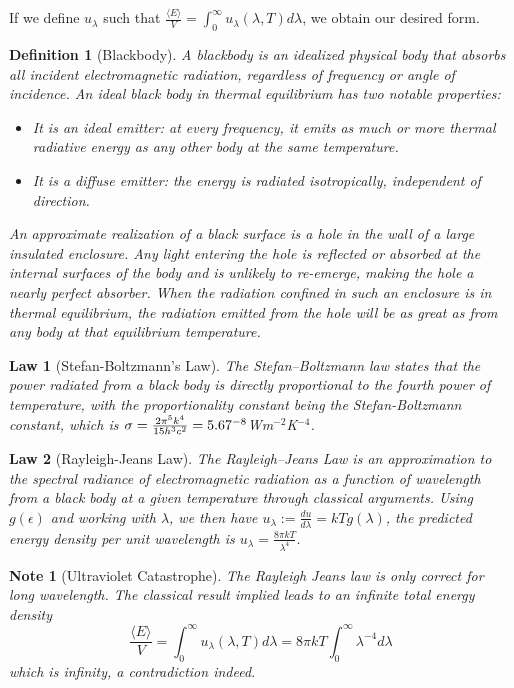 \documentclass[a4paper]{article}
\newtheorem{Note}{Note}[section]
\theoremstyle{new}
\newtheorem{law}{Law}[section]
\newtheorem{defi}{Definition}[section]
\begin{document}
If we define $u_\lambda$ such that $\frac{\langle E\rangle}{V}=\int_0^\infty u_\lambda(\lambda,T)d\lambda$, we obtain our desired form.
\begin{defi}[Blackbody]
A blackbody is an idealized physical body that absorbs all incident electromagnetic radiation, regardless of frequency or angle of incidence. An ideal black body in thermal equilibrium has two notable properties:
\begin{itemize}
    \item It is an ideal emitter: at every frequency, it emits as much or more thermal radiative energy as any other body at the same temperature.
    \item It is a diffuse emitter: the energy is radiated isotropically, independent of direction.
\end{itemize}
An approximate realization of a black surface is a hole in the wall of a large insulated enclosure. Any light entering the hole is reflected or absorbed at the internal surfaces of the body and is unlikely to re-emerge, making the hole a nearly perfect absorber. When the radiation confined in such an enclosure is in thermal equilibrium, the radiation emitted from the hole will be as great as from any body at that equilibrium temperature.
\end{defi}
\begin{law}[Stefan-Boltzmann's Law]
The Stefan–Boltzmann law states that the power radiated from a black body is directly proportional to the fourth power of temperature, with the proportionality constant being the Stefan-Boltzmann constant, which is $\sigma=\frac{2\pi^5k^4}{15h^3c^2}=5.67\time10^{-8}$Wm$^{-2}$K$^{-4}$. 
\end{law}
\begin{law}[Rayleigh-Jeans Law]
The Rayleigh–Jeans Law is an approximation to the spectral radiance of electromagnetic radiation as a function of wavelength from a black body at a given temperature through classical arguments. Using $g(\epsilon)$ and working with $\lambda$, we then have $u_\lambda:=\frac{du}{d\lambda}=kTg(\lambda)$, the predicted energy density per unit wavelength is $u_\lambda=\frac{8\pi kT}{\lambda^4}$.
\end{law}
\begin{Note}[Ultraviolet Catastrophe]
The Rayleigh Jeans law is only correct for long wavelength. The classical result implied leads to an infinite total energy density
$$\frac{\langle E\rangle}{V}=\int_0^\infty u_\lambda(\lambda,T)d\lambda=8\pi kT\int_0^\infty\lambda^{-4}d\lambda$$
which is infinity, a contradiction indeed.
\end{Note}
\end{document}
